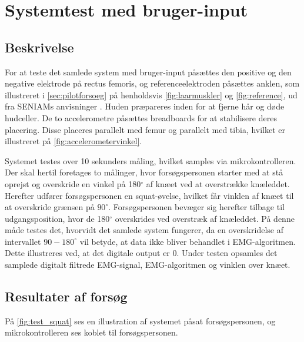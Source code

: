 \section{Systemtest med bruger-input}

\subsection{Beskrivelse}
For at teste det samlede system med bruger-input påsættes den positive og den negative elektrode på rectus femoris, og referenceelektroden påsættes anklen, som illustreret i \autoref{sec:pilotforsoeg} på henholdsvis \autoref{fig:laarmuskler} og \autoref{fig:reference}, ud fra SENIAMs anvisninger \citep{seniam2016}. Huden præpareres inden for at fjerne hår og døde hudceller. 
De to accelerometre påsættes breadboards for at stabilisere deres placering. Disse placeres parallelt med femur og parallelt med tibia, hvilket er illustreret på \autoref{fig:accelerometervinkel}.

Systemet testes over 10 sekunders måling, hvilket samples via mikrokontrolleren. Der skal hertil foretages to målinger, hvor forsøgspersonen starter med at stå oprejst og overskride en vinkel på 180$^{\circ}$ af knæet ved at overstrække knæleddet. Herefter udfører forsøgspersonen en squat-øvelse, hvilket får vinklen af knæet til at overskride grænsen på $90^{\circ}$. Forsøgspersonen bevæger sig herefter tilbage til udgangsposition, hvor de 180$^{\circ}$ overskrides ved overstræk af knæleddet.
På denne måde testes det, hvorvidt det samlede system fungerer, da en overskridelse af intervallet $90-180^{\circ}$ vil betyde, at data ikke bliver behandlet i EMG-algoritmen. Dette illustreres ved, at det digitale output er 0. Under testen opsamles det samplede digitalt filtrede EMG-signal, EMG-algoritmen og vinklen over knæet.

\subsection{Resultater af forsøg}

På \autoref{fig:test_squat} ses en illustration af systemet påsat forsøgspersonen, og mikrokontrolleren ses koblet til forsøgspersonen.


